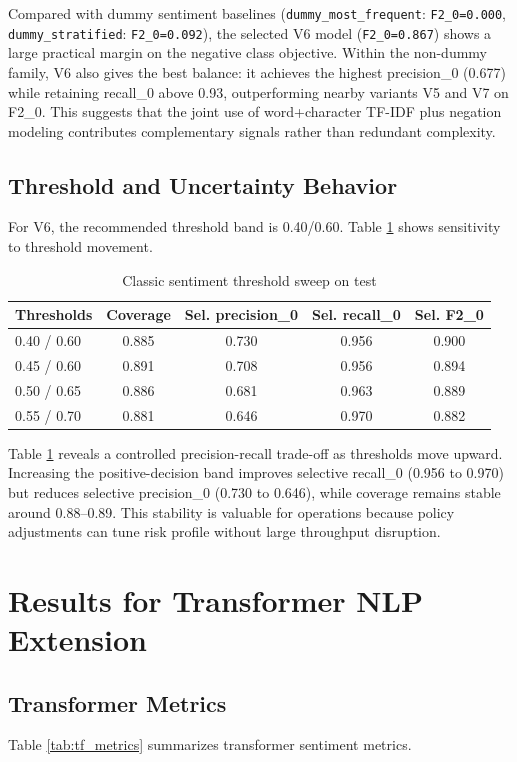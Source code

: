 \documentclass[12pt,a4paper]{article}
\begin{document}
Compared with dummy sentiment baselines (\texttt{dummy\_most\_frequent}: \texttt{F2\_0=0.000}, \texttt{dummy\_stratified}: \texttt{F2\_0=0.092}), the selected V6 model (\texttt{F2\_0=0.867}) shows a large practical margin on the negative class objective.
Within the non-dummy family, V6 also gives the best balance: it achieves the highest precision\_0 (0.677) while retaining recall\_0 above 0.93, outperforming nearby variants V5 and V7 on F2\_0. This suggests that the joint use of word+character TF-IDF plus negation modeling contributes complementary signals rather than redundant complexity.

\subsection{Threshold and Uncertainty Behavior}
For V6, the recommended threshold band is 0.40/0.60. Table \ref{tab:classic_threshold} shows sensitivity to threshold movement.

\begin{table}[H]
\centering
\caption{Classic sentiment threshold sweep on test}
\label{tab:classic_threshold}
\begin{tabular}{lcccc}
\toprule
Thresholds & Coverage & Sel. precision\_0 & Sel. recall\_0 & Sel. F2\_0 \\
\midrule
0.40 / 0.60 & 0.885 & 0.730 & 0.956 & 0.900 \\
0.45 / 0.60 & 0.891 & 0.708 & 0.956 & 0.894 \\
0.50 / 0.65 & 0.886 & 0.681 & 0.963 & 0.889 \\
0.55 / 0.70 & 0.881 & 0.646 & 0.970 & 0.882 \\
\bottomrule
\end{tabular}
\end{table}

Table \ref{tab:classic_threshold} reveals a controlled precision-recall trade-off as thresholds move upward. Increasing the positive-decision band improves selective recall\_0 (0.956 to 0.970) but reduces selective precision\_0 (0.730 to 0.646), while coverage remains stable around 0.88--0.89. This stability is valuable for operations because policy adjustments can tune risk profile without large throughput disruption.

\section{Results for Transformer NLP Extension}
\subsection{Transformer Metrics}
Table \ref{tab:tf_metrics} summarizes transformer sentiment metrics.
\end{document}
